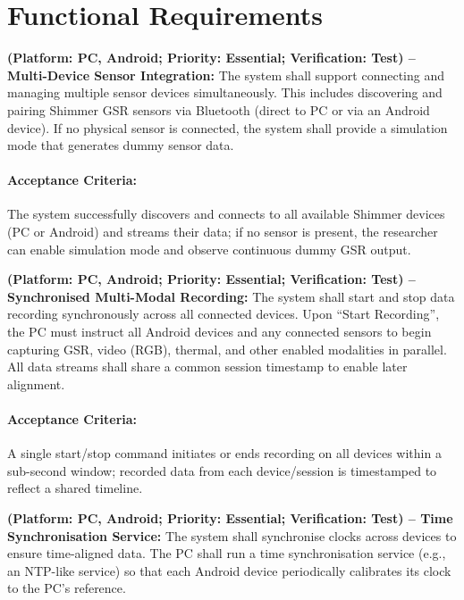 \section{Functional Requirements}

\begin{description}[style=unboxed,leftmargin=0cm]
    \item[\textbf{FR1}] \textbf{(Platform: PC, Android; Priority: Essential; Verification: Test) – Multi-Device Sensor Integration:} The system shall support connecting and managing multiple sensor devices simultaneously. This includes discovering and pairing Shimmer GSR sensors via Bluetooth (direct to PC or via an Android device). If no physical sensor is connected, the system shall provide a simulation mode that generates dummy sensor data.

    \paragraph{Acceptance Criteria:} The system successfully discovers and connects to all available Shimmer devices (PC or Android) and streams their data; if no sensor is present, the researcher can enable simulation mode and observe continuous dummy GSR output.

    \item[\textbf{FR2}] \textbf{(Platform: PC, Android; Priority: Essential; Verification: Test) – Synchronised Multi-Modal Recording:} The system shall start and stop data recording synchronously across all connected devices. Upon “Start Recording”, the PC must instruct all Android devices and any connected sensors to begin capturing GSR, video (RGB), thermal, and other enabled modalities in parallel. All data streams shall share a common session timestamp to enable later alignment.

    \paragraph{Acceptance Criteria:} A single start/stop command initiates or ends recording on all devices within a sub-second window; recorded data from each device/session is timestamped to reflect a shared timeline.

    \item[\textbf{FR3}] \textbf{(Platform: PC, Android; Priority: Essential; Verification: Test) – Time Synchronisation Service:} The system shall synchronise clocks across devices to ensure time-aligned data. The PC shall run a time synchronisation service (e.g., an NTP-like service) so that each Android device periodically calibrates its clock to the PC’s reference.


\end{description}
